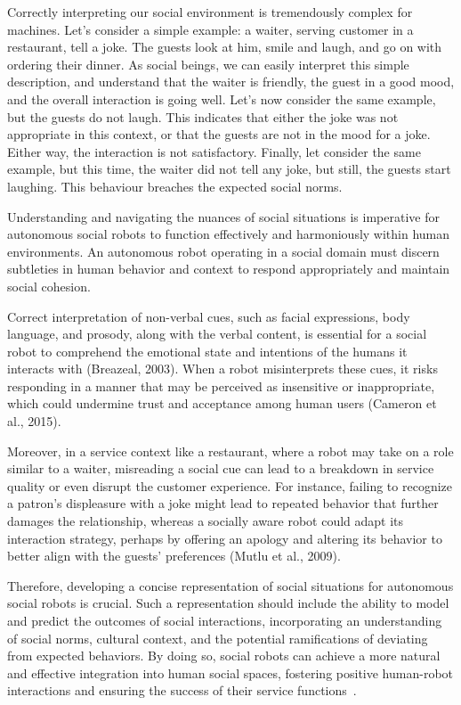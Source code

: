 Correctly interpreting our social environment is tremendously complex for
machines. Let's consider a simple example: a waiter, serving customer in a
restaurant, tell a joke. The guests look at him, smile and laugh, and go on with ordering
their dinner. As social beings, we can easily interpret this simple description,
and understand that the waiter is friendly, the guest in a good mood, and the
overall interaction is going well. Let's now consider the same example, but the
guests do not laugh. This indicates that either the joke was not appropriate in
this context, or that the guests are not in the mood for a joke. Either way, the
interaction is not satisfactory. Finally, let consider the same example, but
this time, the waiter did not tell any joke, but still, the guests start
laughing. This behaviour breaches the expected social norms.

Understanding and navigating the nuances of social situations is imperative for
autonomous social robots to function effectively and harmoniously within human
environments. An autonomous robot operating in a social domain must discern
subtleties in human behavior and context to respond appropriately and maintain
social cohesion.

Correct interpretation of non-verbal cues, such as facial expressions, body
language, and prosody, along with the verbal content, is essential for a social
robot to comprehend the emotional state and intentions of the humans it
interacts with (Breazeal, 2003). When a robot misinterprets these cues, it risks
responding in a manner that may be perceived as insensitive or inappropriate,
which could undermine trust and acceptance among human users (Cameron et al.,
2015).

Moreover, in a service context like a restaurant, where a robot may take on a
role similar to a waiter, misreading a social cue can lead to a breakdown in
service quality or even disrupt the customer experience. For instance, failing
to recognize a patron's displeasure with a joke might lead to repeated behavior
that further damages the relationship, whereas a socially aware robot could
adapt its interaction strategy, perhaps by offering an apology and altering its
behavior to better align with the guests' preferences (Mutlu et al., 2009).

Therefore, developing a concise representation of social situations for
autonomous social robots is crucial. Such a representation should include the
ability to model and predict the outcomes of social interactions, incorporating
an understanding of social norms, cultural context, and the potential
ramifications of deviating from expected behaviors. By doing so, social robots
can achieve a more natural and effective integration into human social spaces,
fostering positive human-robot interactions and ensuring the success of their
service functions~\cite{gockley2005designing}.

